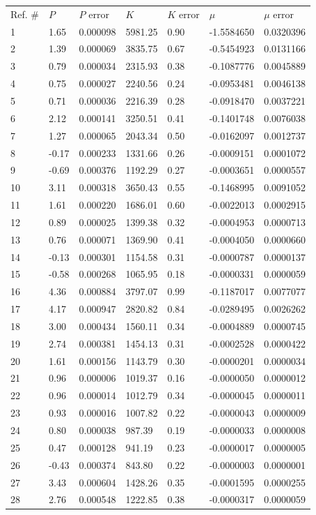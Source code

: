 \documentclass{article}
\begin{document}
\begin{center}
\begin{tabular}{lllllll}
Ref. \# & $P$ & $P$ error & $K$ & $K$ error & $\mu$ & $\mu$ error\\
1 & 1.65 & 0.000098 & 5981.25 & 0.90 & -1.5584650 & 0.0320396\\
2 & 1.39 & 0.000069 & 3835.75 & 0.67 & -0.5454923 & 0.0131166\\
3 & 0.79 & 0.000034 & 2315.93 & 0.38 & -0.1087776 & 0.0045889\\
4 & 0.75 & 0.000027 & 2240.56 & 0.24 & -0.0953481 & 0.0046138\\
5 & 0.71 & 0.000036 & 2216.39 & 0.28 & -0.0918470 & 0.0037221\\
6 & 2.12 & 0.000141 & 3250.51 & 0.41 & -0.1401748 & 0.0076038\\
7 & 1.27 & 0.000065 & 2043.34 & 0.50 & -0.0162097 & 0.0012737\\
8 & -0.17 & 0.000233 & 1331.66 & 0.26 & -0.0009151 & 0.0001072\\
9 & -0.69 & 0.000376 & 1192.29 & 0.27 & -0.0003651 & 0.0000557\\
10 & 3.11 & 0.000318 & 3650.43 & 0.55 & -0.1468995 & 0.0091052\\
11 & 1.61 & 0.000220 & 1686.01 & 0.60 & -0.0022013 & 0.0002915\\
12 & 0.89 & 0.000025 & 1399.38 & 0.32 & -0.0004953 & 0.0000713\\
13 & 0.76 & 0.000071 & 1369.90 & 0.41 & -0.0004050 & 0.0000660\\
14 & -0.13 & 0.000301 & 1154.58 & 0.31 & -0.0000787 & 0.0000137\\
15 & -0.58 & 0.000268 & 1065.95 & 0.18 & -0.0000331 & 0.0000059\\
16 & 4.36 & 0.000884 & 3797.07 & 0.99 & -0.1187017 & 0.0077077\\
17 & 4.17 & 0.000947 & 2820.82 & 0.84 & -0.0289495 & 0.0026262\\
18 & 3.00 & 0.000434 & 1560.11 & 0.34 & -0.0004889 & 0.0000745\\
19 & 2.74 & 0.000381 & 1454.13 & 0.31 & -0.0002528 & 0.0000422\\
20 & 1.61 & 0.000156 & 1143.79 & 0.30 & -0.0000201 & 0.0000034\\
21 & 0.96 & 0.000006 & 1019.37 & 0.16 & -0.0000050 & 0.0000012\\
22 & 0.96 & 0.000014 & 1012.79 & 0.34 & -0.0000045 & 0.0000011\\
23 & 0.93 & 0.000016 & 1007.82 & 0.22 & -0.0000043 & 0.0000009\\
24 & 0.80 & 0.000038 & 987.39 & 0.19 & -0.0000033 & 0.0000008\\
25 & 0.47 & 0.000128 & 941.19 & 0.23 & -0.0000017 & 0.0000005\\
26 & -0.43 & 0.000374 & 843.80 & 0.22 & -0.0000003 & 0.0000001\\
27 & 3.43 & 0.000604 & 1428.26 & 0.35 & -0.0001595 & 0.0000255\\
28 & 2.76 & 0.000548 & 1222.85 & 0.38 & -0.0000317 & 0.0000059
\end{tabular}
\end{center}
\end{document}
